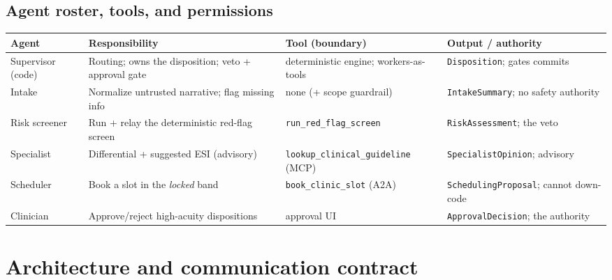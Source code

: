 \documentclass[11pt]{article}
\newcommand{\code}[1]{\texttt{#1}}
\begin{document}
\subsection{Agent roster, tools, and permissions}
\begin{center}\small
\begin{tabular}{@{}p{2.1cm}p{4.1cm}p{2.9cm}p{3.4cm}@{}}
\toprule
\textbf{Agent} & \textbf{Responsibility} & \textbf{Tool (boundary)} & \textbf{Output / authority} \\
\midrule
Supervisor (code) & Routing; owns the disposition; veto + approval gate & deterministic engine; workers-as-tools & \code{Disposition}; gates commits \\
Intake & Normalize untrusted narrative; flag missing info & none (+ scope guardrail) & \code{IntakeSummary}; no safety authority \\
Risk screener & Run + relay the deterministic red-flag screen & \code{run\_red\_flag\_screen} & \code{RiskAssessment}; the veto \\
Specialist & Differential + suggested ESI (advisory) & \code{lookup\_clinical\_guideline} (MCP) & \code{SpecialistOpinion}; advisory \\
Scheduler & Book a slot in the \emph{locked} band & \code{book\_clinic\_slot} (A2A) & \code{SchedulingProposal}; cannot down-code \\
Clinician & Approve/reject high-acuity dispositions & approval UI & \code{ApprovalDecision}; the authority \\
\bottomrule
\end{tabular}
\end{center}

\section{Architecture and communication contract}
\end{document}
